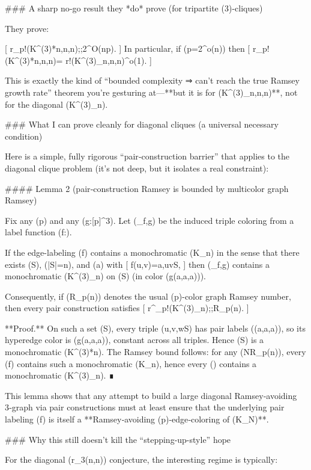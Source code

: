 ### A sharp no‑go result they *do* prove (for tripartite (3)-cliques)

They prove:

[
r_p!\left(K^{(3)}*{n,n,n}\right);\le;2^{O(n\log p)}.
]
In particular, if (p=2^{o(n)}) then
[
r_p!\left(K^{(3)}*{n,n,n}\right)= r!\left(K^{(3)}_{n,n,n}\right)^{o(1)}.
]


This is exactly the kind of “bounded complexity ⇒ can’t reach the true Ramsey growth rate” theorem you’re gesturing at—**but it is for (K^{(3)}_{n,n,n})**, not for the diagonal (K^{(3)}_n).

### What I can prove cleanly for diagonal cliques (a universal necessary condition)

Here is a simple, fully rigorous “pair‑construction barrier” that applies to the diagonal clique problem (it’s not deep, but it isolates a real constraint):

#### Lemma 2 (pair‑construction Ramsey is bounded by multicolor graph Ramsey)

Fix any (p) and any (g:[p]^3). Let (\chi_{f,g}) be the induced triple coloring from a label function (f:\to[p]).

If the edge-labeling (f) contains a monochromatic (K_n) in the sense that there exists (S\subseteq[N]), (|S|=n), and (a\in[p]) with
[
f({u,v})=a\quad \forall,u\neq v\in S,
]
then (\chi_{f,g}) contains a monochromatic (K^{(3)}_n) on (S) (in color (g(a,a,a))).

Consequently, if (R_p(n)) denotes the usual (p)-color graph Ramsey number, then every pair construction satisfies
[
r^{}_p!\left(K^{(3)}_n\right);\le;R_p(n).
]

**Proof.**
On such a set (S), every triple ({u,v,w}\subseteq S) has pair labels ((a,a,a)), so its hyperedge color is (g(a,a,a)), constant across all triples. Hence (S) is a monochromatic (K^{(3)}*n). The Ramsey bound follows: for any (N\ge R_p(n)), every (f) contains such a monochromatic (K_n), hence every () contains a monochromatic (K^{(3)}_n). ∎

This lemma shows that any attempt to build a large diagonal Ramsey‑avoiding 3‑graph via pair constructions must at least ensure that the underlying pair labeling (f) is itself a **Ramsey‑avoiding (p)-edge‑coloring of (K_N)**.

### Why this still doesn’t kill the “stepping-up-style” hope

For the diagonal (r_3(n,n)) conjecture, the interesting regime is typically:

